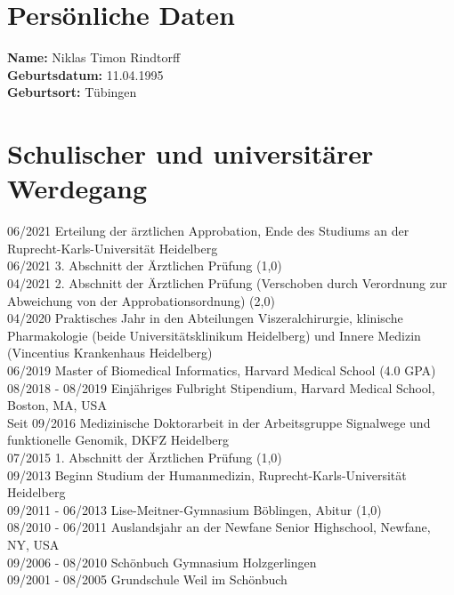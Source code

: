 
\pagestyle{empty}
\begin{flushleft}

\section*{Persönliche Daten}

\textbf{Name:} Niklas Timon Rindtorff \\
\textbf{Geburtsdatum:} 11.04.1995 \\
\textbf{Geburtsort:} Tübingen \\


\section*{Schulischer und universitärer Werdegang}

06/2021 \hspace{5mm} Erteilung der ärztlichen Approbation, Ende des Studiums an der Ruprecht-Karls-Universität Heidelberg \\
06/2021 \hspace{5mm} 3. Abschnitt der Ärztlichen Prüfung (1,0) \\
04/2021 \hspace{5mm} 2. Abschnitt der Ärztlichen Prüfung (Verschoben durch Verordnung zur Abweichung von der Approbationsordnung) (2,0) \\
04/2020 \hspace{5mm} Praktisches Jahr in den Abteilungen Viszeralchirurgie, klinische Pharmakologie (beide Universitätsklinikum Heidelberg) und Innere Medizin (Vincentius Krankenhaus Heidelberg) \\
06/2019 \hspace{5mm} Master of Biomedical Informatics, Harvard Medical School (4.0 GPA) \\
08/2018 - 08/2019 \hspace{5mm} Einjähriges Fulbright Stipendium, Harvard Medical School, Boston, MA, USA \\
Seit 09/2016 \hspace{5mm} Medizinische Doktorarbeit in der Arbeitsgruppe Signalwege und funktionelle Genomik, DKFZ Heidelberg \\
07/2015 \hspace{5mm} 1. Abschnitt der Ärztlichen Prüfung (1,0)  \\
09/2013 \hspace{5mm} Beginn Studium der Humanmedizin, Ruprecht-Karls-Universität Heidelberg \\
09/2011 - 06/2013 \hspace{5mm} Lise-Meitner-Gymnasium Böblingen, Abitur (1,0) \\
08/2010 - 06/2011 \hspace{5mm} Auslandsjahr an der Newfane Senior Highschool, Newfane, NY, USA \\
09/2006 - 08/2010 \hspace{5mm} Schönbuch Gymnasium Holzgerlingen \\
09/2001 - 08/2005 \hspace{5mm} Grundschule Weil im Schönbuch \\
\end{flushleft}


